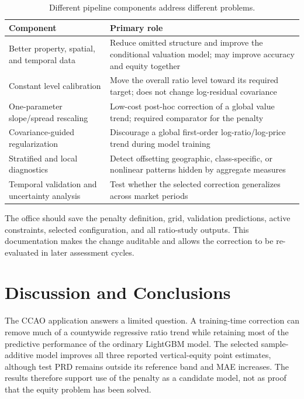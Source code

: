 \documentclass[10pt]{article}
\theoremstyle{definition}
\newcommand{\1}{\mathbf{1}}
\newcommand{\advisorchange}[1]{{\color{blue}#1}}
\begin{document}
{{\begin{table}[t]
\centering
\caption{Different pipeline components address different problems.}
\label{tab:roles}
\begin{tabular}{p{4.2cm}p{10.0cm}}
\toprule
Component & Primary role \\
\midrule
Better property, spatial, and temporal data & Reduce omitted structure and improve the conditional valuation model; may improve accuracy and equity together \\
Constant level calibration & Move the overall ratio level toward its required target; does not change log-residual covariance \\
One-parameter slope/spread rescaling & Low-cost post-hoc correction of a global value trend; required comparator for the penalty \\
Covariance-guided regularization & Discourage a global first-order log-ratio/log-price trend during model training \\
Stratified and local diagnostics & Detect offsetting geographic, class-specific, or nonlinear patterns hidden by aggregate measures \\
Temporal validation and uncertainty analysis & Test whether the selected correction generalizes across market periods \\
\bottomrule
\end{tabular}
\end{table}

The office should save the penalty definition, grid, validation predictions, active constraints, selected configuration, and all ratio-study outputs. This documentation makes the change auditable and allows the correction to be re-evaluated in later assessment cycles.

\section{Discussion and Conclusions}
\label{sec:discussion}

\advisorchange{The CCAO application answers a limited question.} A training-time correction can remove much of a countywide regressive ratio trend while retaining most of the predictive performance of the ordinary LightGBM model. The selected sample-additive model improves all three reported vertical-equity point estimates, although test PRD remains outside its reference band and MAE increases. \advisorchange{The results therefore support use of the penalty as a candidate model}, not as proof that the equity problem has been solved.

}}
\end{document}
